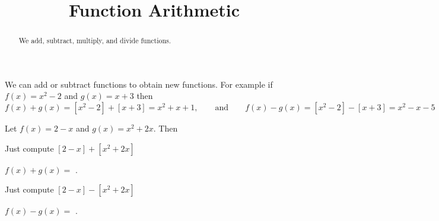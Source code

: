 \documentclass{ximera}
\title{Function Arithmetic}
\begin{document}
\begin{abstract}
We add, subtract, multiply, and divide functions.
\end{abstract}
\maketitle


We can add or subtract functions to obtain new functions. For example if $f(x)=x^2-2$ and $g(x)=x+3$ then 
\[
f(x)+g(x)=[x^2-2]+[x+3]=x^2+x+1,\qquad\text{and}\qquad f(x)-g(x)=[x^2-2]-[x+3]=x^2-x-5
\]

\begin{question}
Let $f(x)=2-x$ and $g(x)=x^2+2x$. Then

\begin{hint}
Just compute $[2-x]+[x^2+2x]$
\end{hint}
\begin{prompt}
$f(x)+g(x)=$ .
\end{prompt}

\begin{hint}
Just compute $[2-x]-[x^2+2x]$
\end{hint}
\begin{prompt}
$f(x)-g(x)=$ .
\end{prompt}

\end{question}
\end{document}

